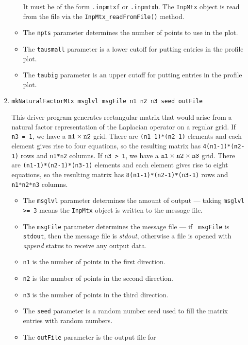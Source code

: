 \begin{enumerate}
\begin{itemize}
It must be of the form {\tt *.inpmtxf} or {\tt *.inpmtxb}.
The {\tt InpMtx} object is read from the file via the
{\tt InpMtx\_readFromFile()} method.
\item
The {\tt npts} parameter determines the number of points to use in
the plot.
\item
The {\tt tausmall} parameter is a lower cutoff for putting entries
in the profile plot.
\item
The {\tt taubig} parameter is an upper cutoff for putting entries
in the profile plot.
\end{itemize}
\item
\begin{verbatim}
mkNaturalFactorMtx msglvl msgFile n1 n2 n3 seed outFile 
\end{verbatim}
This driver program generates rectangular matrix that would arise
from a natural factor representation of the Laplacian operator on a
regular grid.
If {\tt n3 = 1}, we have a ${\tt n1} \times {\tt n2}$ grid.
There are {\tt (n1-1)*(n2-1)} elements and each element gives rise
to four equations, so the resulting matrix has
{\tt 4(n1-1)*(n2-1)} rows and {\tt n1*n2} columns.
If {\tt n3 > 1}, 
we have a ${\tt n1} \times {\tt n2} \times {\tt n3}$ grid.
There are {\tt (n1-1)*(n2-1)*(n3-1)} elements 
and each element gives rise
to eight equations, so the resulting matrix has
{\tt 8(n1-1)*(n2-1)*(n3-1)} rows and {\tt n1*n2*n3} columns.
\par
\begin{itemize}
\item
The {\tt msglvl} parameter determines the amount of output ---
taking {\tt msglvl >= 3} means the {\tt InpMtx} object is written
to the message file.
\item
The {\tt msgFile} parameter determines the message file --- if {\tt
msgFile} is {\tt stdout}, then the message file is {\it stdout},
otherwise a file is opened with {\it append} status to receive any
output data.
\item
{\tt n1} is the number of points in the first direction.
\item
{\tt n2} is the number of points in the second direction.
\item
{\tt n3} is the number of points in the third direction.
\item
The {\tt seed} parameter is a random number seed used to fill the
matrix entries with random numbers.
\item
The {\tt outFile} parameter is the output file for 

\end{itemize}
\end{enumerate}
